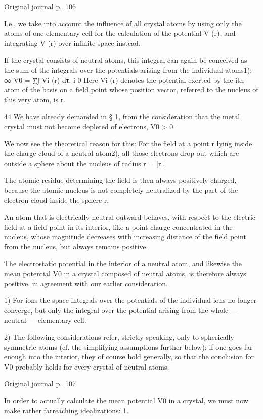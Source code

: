 \documentclass[10pt]{article}
\newcommand{\origpage}[1]{\par\medskip\noindent\hfill{\small\color{notegray}Original journal p.~#1}\hfill\mbox{}\par\smallskip}
\begin{document}
\origpage{106}
I.e., we take into account the influence of all crystal atoms by using only the atoms of one elementary cell for the calculation of the potential V (r), and integrating V (r) over infinite space instead.\par
If the crystal consists of neutral atoms, this integral can again be conceived as the sum of the integrals over the potentials arising from the individual atoms1): ∞ V0 = ∑∫ Vi (r) dτ. i 0 Here Vi (r) denotes the potential exerted by the ith atom of the basis on a field point whose position vector, referred to the nucleus of this very atom, is r.\par
44 We have already demanded in § 1, from the consideration that the metal crystal must not become depleted of electrons, V0 > 0.\par
We now see the theoretical reason for this: For the field at a point r lying inside the charge cloud of a neutral atom2), all those electrons drop out which are outside a sphere about the nucleus of radius r = |r|.\par
The atomic residue determining the field is then always positively charged, because the atomic nucleus is not completely neutralized by the part of the electron cloud inside the sphere r.\par
An atom that is electrically neutral outward behaves, with respect to the electric field at a field point in its interior, like a point charge concentrated in the nucleus, whose magnitude decreases with increasing distance of the field point from the nucleus, but always remains positive.\par
The electrostatic potential in the interior of a neutral atom, and likewise the mean potential V0 in a crystal composed of neutral atoms, is therefore always positive, in agreement with our earlier consideration.\par
\noindent\footnotesize 1) For ions the space integrals over the potentials of the individual ions no longer converge, but only the integral over the potential arising from the whole — neutral — elementary cell.\par\normalsize
\noindent\footnotesize 2) The following considerations refer, strictly speaking, only to spherically symmetric atoms (cf. the simplifying assumptions further below); if one goes far enough into the interior, they of course hold generally, so that the conclusion for V0 probably holds for every crystal of neutral atoms.\par\normalsize
\origpage{107}
In order to actually calculate the mean potential V0 in a crystal, we must now make rather farreaching idealizations: 1.\par
\end{document}
